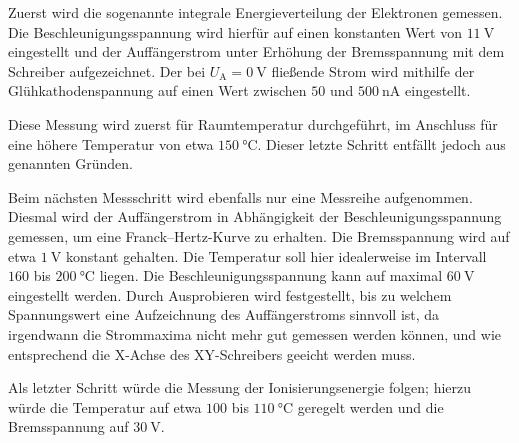 Zuerst wird die sogenannte integrale Energieverteilung der Elektronen gemessen. Die Beschleunigungsspannung wird hierfür auf 
einen konstanten Wert von $\SI{11}{\volt}$ eingestellt und der Auffängerstrom unter Erhöhung der Bremsspannung mit 
dem Schreiber aufgezeichnet. 
Der bei $U_\text{A}=\SI{0}{\volt}$ fließende Strom wird mithilfe der Glühkathodenspannung auf einen Wert zwischen $50$ und $\SI{500}{\nano\ampere}$
eingestellt. 

Diese Messung wird zuerst für Raumtemperatur durchgeführt, im Anschluss für eine höhere Temperatur von etwa $\SI{150}{\degreeCelsius}$. 
Dieser letzte Schritt entfällt jedoch aus genannten Gründen. 

Beim nächsten Messschritt wird ebenfalls nur eine Messreihe aufgenommen. 
Diesmal wird der Auffängerstrom in Abhängigkeit der Beschleunigungsspannung gemessen, um eine Franck--Hertz-Kurve zu erhalten. 
Die Bremsspannung wird auf etwa $\SI{1}{\volt}$ konstant gehalten. 
Die Temperatur soll hier idealerweise im Intervall $160$ bis $\SI{200}{\degreeCelsius}$ liegen. 
Die Beschleunigungsspannung kann auf maximal $\SI{60}{\volt}$ eingestellt werden. 
Durch Ausprobieren wird festgestellt, bis zu welchem Spannungswert eine Aufzeichnung des Auffängerstroms sinnvoll ist, 
da irgendwann die Strommaxima nicht mehr gut gemessen werden können, und wie entsprechend die X-Achse des XY-Schreibers 
geeicht werden muss. 

Als letzter Schritt würde die Messung der Ionisierungsenergie folgen; hierzu würde die Temperatur auf etwa $100$ bis $\SI{110}{\degreeCelsius}$ 
geregelt werden und die Bremsspannung auf $\SI{30}{\volt}$.
